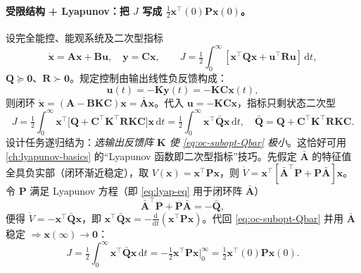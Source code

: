 \paragraph{受限结构 + Lyapunov：把 $J$ 写成 $\tfrac12\mathbf x^\top(0)\mathbf P\mathbf x(0)$。}
设完全能控、能观系统及二次型指标
\begin{equation}
  \dot{\mathbf x}=\mathbf A\mathbf x+\mathbf B\mathbf u,\quad\mathbf y=\mathbf C\mathbf x,\qquad
  J=\tfrac12\int_0^\infty[\mathbf x^\top\mathbf Q\mathbf x+\mathbf u^\top\mathbf R\mathbf u]\,\mathrm dt,
  \label{eq:oc-subopt-sys}
\end{equation}
$\mathbf Q\succeq\mathbf0$、$\mathbf R\succ\mathbf0$。规定控制由输出线性负反馈构成：
\begin{equation}
  \mathbf u(t)=-\mathbf K\mathbf y(t)=-\mathbf K\mathbf C\mathbf x(t),
  \label{eq:oc-subopt-u}
\end{equation}
则闭环 $\dot{\mathbf x}=(\mathbf A-\mathbf B\mathbf K\mathbf C)\mathbf x=\bar{\mathbf A}\mathbf x$。代入 $\mathbf u=-\mathbf K\mathbf C\mathbf x$，指标只剩状态二次型
\begin{equation}
  J=\tfrac12\int_0^\infty\mathbf x^\top\big[\mathbf Q+\mathbf C^\top\mathbf K^\top\mathbf R\mathbf K\mathbf C\big]\mathbf x\,\mathrm dt=\tfrac12\int_0^\infty\mathbf x^\top\bar{\mathbf Q}\mathbf x\,\mathrm dt,\quad\bar{\mathbf Q}=\mathbf Q+\mathbf C^\top\mathbf K^\top\mathbf R\mathbf K\mathbf C.
  \label{eq:oc-subopt-Qbar}
\end{equation}
设计任务遂归结为：\emph{选输出反馈阵 $\mathbf K$ 使 \cref{eq:oc-subopt-Qbar} 极小}。这恰好可用 \cref{ch:lyapunov-basics} 的“Lyapunov 函数即二次型指标”技巧。先假定 $\bar{\mathbf A}$ 的特征值全具负实部（闭环渐近稳定），取 $V(\mathbf x)=\mathbf x^\top\mathbf P\mathbf x$，则 $\dot V=\mathbf x^\top[\bar{\mathbf A}^\top\mathbf P+\mathbf P\bar{\mathbf A}]\mathbf x$。令 $\mathbf P$ 满足 Lyapunov 方程（即 \cref{eq:lyap-eq} 用于闭环阵 $\bar{\mathbf A}$）
\begin{equation}
  \bar{\mathbf A}^\top\mathbf P+\mathbf P\bar{\mathbf A}=-\bar{\mathbf Q},
  \label{eq:oc-subopt-lyap}
\end{equation}
便得 $\dot V=-\mathbf x^\top\bar{\mathbf Q}\mathbf x$，即 $\mathbf x^\top\bar{\mathbf Q}\mathbf x=-\frac{\mathrm d}{\mathrm dt}(\mathbf x^\top\mathbf P\mathbf x)$。代回 \cref{eq:oc-subopt-Qbar} 并用 $\bar{\mathbf A}$ 稳定 $\Rightarrow\mathbf x(\infty)\to\mathbf0$：
\begin{equation}
  J=\tfrac12\int_0^\infty\mathbf x^\top\bar{\mathbf Q}\mathbf x\,\mathrm dt=-\tfrac12\mathbf x^\top\mathbf P\mathbf x\Big|_0^\infty=\boxed{\tfrac12\mathbf x^\top(0)\mathbf P\mathbf x(0).}
  \label{eq:oc-subopt-J}
\end{equation}

